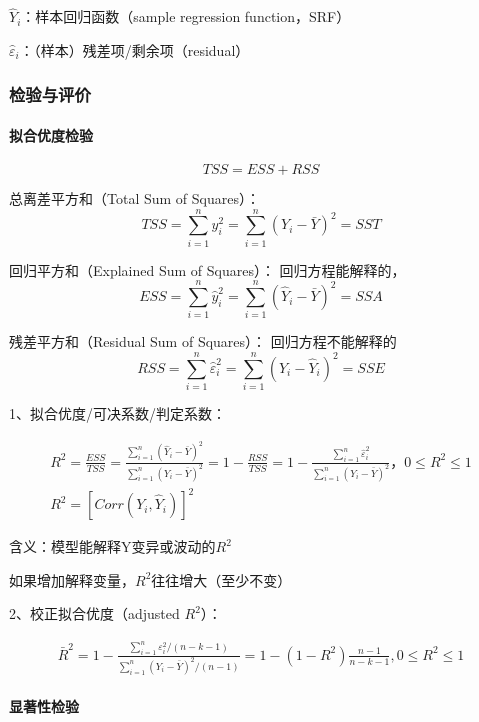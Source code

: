 \documentclass[12pt]{book}
\begin{document}
\par ${\hat{Y}}_i$：样本回归函数（sample regression function，SRF）
\par ${\hat{\varepsilon}}_i$：（样本）残差项/剩余项（residual）

\subsubsection{检验与评价}

\paragraph{拟合优度检验}

$$
TSS=ESS+RSS
$$

\par 总离差平方和（Total Sum of Squares）：  
$$ TSS=\sum_{i=1}^{n}y_i^2=\sum_{i=1}^{n}\left(Y_i-\bar{Y}\right)^2=SST $$  
\par 回归平方和（Explained Sum of Squares）： 回归方程能解释的，  
$$ ESS=\sum_{i=1}^{n}{\hat{y}}_i^2=\sum_{i=1}^{n}\left({\hat{Y}}_i-\bar{Y}\right)^2=SSA $$
\par 残差平方和（Residual Sum of Squares）： 回归方程不能解释的  
$$ RSS=\sum_{i=1}^{n}{\hat{\varepsilon}}_i^2=\sum_{i=1}^{n}\left(Y_i-{\hat{Y}}_i\right)^2=SSE $$


1、拟合优度/可决系数/判定系数：

\begin{gather*}
R^2=\frac{ESS}{TSS} 
=\frac{\sum_{i=1}^{n}\left({\hat{Y}}_i-\bar{Y}\right)^2}{\sum_{i=1}^{n}\left(Y_i-\bar{Y}\right)^2} 
=1-\frac{RSS}{TSS}
=1-\frac{\sum_{i=1}^{n}{\hat{\varepsilon}}_i^2}{\sum_{i=1}^{n}\left(Y_i-\bar{Y}\right)^2}，0≤R^2≤1 \\ 
R^2=\left[Corr\left(Y_i,{\hat{Y}}_i\right)\right]^2
\end{gather*}


\par 含义：模型能解释Y变异或波动的$R^2$  
\par 如果增加解释变量，$R^2$往往增大（至少不变）

2、校正拟合优度（adjusted $R^2$）：

\begin{gather*}
    {\bar{R}}^2 
=1-\frac{\sum_{i=1}^{n}{\varepsilon_i^2/(n-k-1)}}{\sum_{i=1}^{n}{(Y_i-\bar{Y})^2}/(n-1)} 
=1-(1-R^2)\frac{n-1}{n-k-1}, 0\leqslant R^2\leqslant 1
\end{gather*}


\paragraph{显著性检验}
\end{document}
